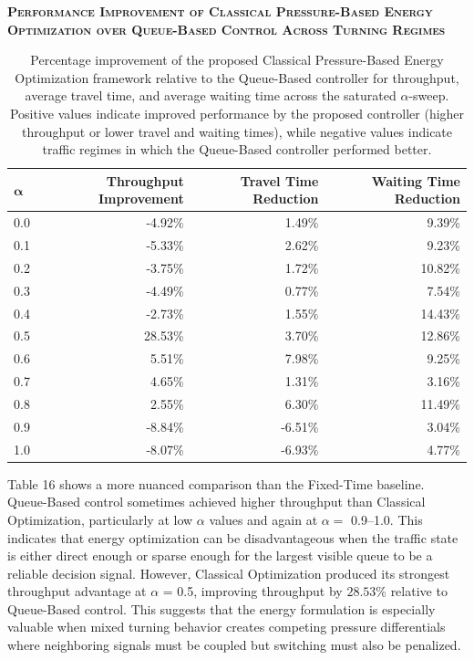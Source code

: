 \documentclass[12pt]{article}
\begin{document}
\begin{table}[H]
\centering
\textbf{\textsc{Performance Improvement of Classical Pressure-Based Energy Optimization over Queue-Based Control Across Turning Regimes}}

\vspace{0.3cm}

\begin{tabular}{@{} l r r r @{}}
\toprule
$\boldsymbol{\alpha}$ & \textbf{Throughput Improvement} & \textbf{Travel Time Reduction} & \textbf{Waiting Time Reduction} \\
\midrule
0.0 & -4.92\% & 1.49\% & 9.39\% \\
0.1 & -5.33\% & 2.62\% & 9.23\% \\
0.2 & -3.75\% & 1.72\% & 10.82\% \\
0.3 & -4.49\% & 0.77\% & 7.54\% \\
0.4 & -2.73\% & 1.55\% & 14.43\% \\
0.5 & 28.53\% & 3.70\% & 12.86\% \\
0.6 & 5.51\% & 7.98\% & 9.25\% \\
0.7 & 4.65\% & 1.31\% & 3.16\% \\
0.8 & 2.55\% & 6.30\% & 11.49\% \\
0.9 & -8.84\% & -6.51\% & 3.04\% \\
1.0 & -8.07\% & -6.93\% & 4.77\% \\
\bottomrule
\end{tabular}

\caption{Percentage improvement of the proposed Classical Pressure-Based Energy Optimization framework relative to the Queue-Based controller for throughput, average travel time, and average waiting time across the saturated $\alpha$-sweep. Positive values indicate improved performance by the proposed controller (higher throughput or lower travel and waiting times), while negative values indicate traffic regimes in which the Queue-Based controller performed better.}
\label{tab:queue-vs-classical-percent-table}
\end{table}

Table 16 shows a more nuanced comparison than the Fixed-Time baseline. Queue-Based control sometimes achieved higher throughput than Classical Optimization, particularly at low $\alpha$ values and again at $\alpha=$ 0.9–1.0. This indicates that energy optimization can be disadvantageous when the traffic state is either direct enough or sparse enough for the largest visible queue to be a reliable decision signal. However, Classical Optimization produced its strongest throughput advantage at $\alpha$ = 0.5, improving throughput by $28.53\%$ relative to Queue-Based control. This suggests that the energy formulation is especially valuable when mixed turning behavior creates competing pressure differentials where neighboring signals must be coupled but switching must also be penalized.
\end{document}
